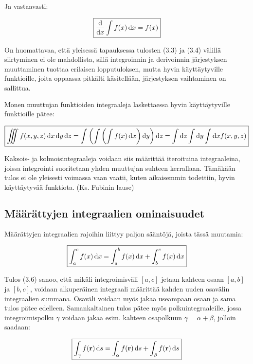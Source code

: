 \documentclass[../integrointiopas.tex]{subfiles}
\begin{document}
	Ja vastaavasti:
	
	\begin{equation}
		\boxed{\odv{}{x}\int f(x)\odif{x} = f(x)}
	\end{equation}
	
	On huomattavaa, että yleisessä tapauksessa tulosten (3.3) ja (3.4) välillä siirtyminen ei ole mahdollista, sillä integroinnin ja derivoinnin järjestyksen muuttaminen tuottaa erilaisen lopputuloksen, mutta hyvin käyttäytyville funktioille, joita oppaassa pitkälti käsitellään, järjestyksen vaihtaminen on sallittua.
	
	Monen muuttujan funktioiden integraaleja laskettaessa hyvin käyttäytyville funktioille pätee:
	
	\begin{equation}
		\boxed{\iiint f(x,y,z)\odif{x,y,z} = \int\left(\int\left(\int f(x)\odif{x}\right)\odif{y}\right)\odif{z} = \int\odif{z}\int\odif{y}\int\odif{x}f(x,y,z)}
	\end{equation}
	
	Kaksois- ja kolmoisintegraaleja voidaan siis määrittää iteroituina integraaleina, joissa integrointi suoritetaan yhden muuttujan suhteen kerrallaan. Tämäkään tulos ei ole yleisesti voimassa vaan vaatii, kuten aikaisemmin todettiin, hyvin käyttäytyvää funktiota. (Ks. Fubinin lause)
	
	\subsection{Määrättyjen integraalien ominaisuudet}
	
	Määrättyjen integraalien rajoihin liittyy paljon sääntöjä, joista tässä muutamia:
	
	\begin{equation}
		\boxed{\int_{a}^{c}f(x)\odif{x} = \int_{a}^{b}f(x)\odif{x} + \int_{b}^{c}f(x)\odif{x}}
	\end{equation}
	
	Tulos (3.6) sanoo, että mikäli integroimisväli $[a, c]$ jetaan kahteen osaan $[a, b]$ ja $[b, c]$, voidaan alkuperäinen integraali määrittää kahden uuden osavälin integraalien summana. Osaväli voidaan myös jakaa useampaan osaan ja sama tulos pätee edelleen. Samankaltainen tulos pätee myös polkuintegraaleille, jossa integroimispolku $\gamma$ voidaan jakaa esim. kahteen osapolkuun $\gamma = \alpha + \beta$, jolloin saadaan:
	
	\begin{equation}
		\boxed{\int_{\gamma}f(\vtr{r})\odif{s} = \int_{\alpha}f(\vtr{r})\odif{s} + \int_{\beta}f(\vtr{r})\odif{s}}
	\end{equation}
	
\end{document}
